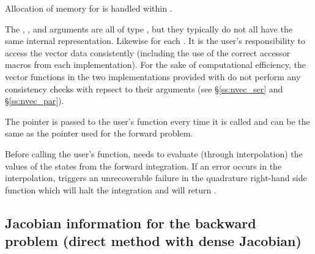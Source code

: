 {
  Allocation of memory for  is handled within {\cvodes}.

  The , , and  arguments are all of type ,
  but they typically do not all have the same internal representation.
  Likewise for each .  It is the user's 
  responsibility to access the vector data consistently (including the use of the 
  correct accessor macros from each {\nvector} implementation). For the sake of 
  computational efficiency, the vector functions in the two {\nvector} implementations 
  provided with {\cvodes} do not perform any consistency checks with repsect to their 
   arguments (see \S\ref{ss:nvec_ser} and \S\ref{ss:nvec_par}).

  The  pointer is passed to the user's  function every time 
  it is called and can be the same as the  pointer used for the forward problem.

  {\warn}Before calling the user's  function, {\cvodes} needs to evaluate
  (through interpolation) the values of the states from the forward integration. 
  If an error occurs in the interpolation, {\cvodes} triggers an unrecoverable
  failure in the quadrature right-hand side function which will halt the integration and
   will return .
}


\subsection{Jacobian information for the backward problem 
  (direct method with dense Jacobian)}\label{ss:densejac_b}
  
